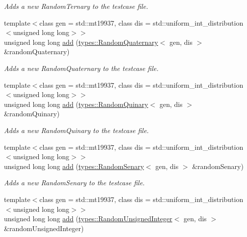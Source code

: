 \begin{DoxyCompactItemize}
\begin{DoxyCompactList}\small\item\em Adds a new Random\+Ternary to the testcase file. \end{DoxyCompactList}\item 
{\footnotesize template$<$class gen  = std\+::mt19937, class dis  = std\+::uniform\+\_\+int\+\_\+distribution$<$unsigned long long$>$$>$ }\\unsigned long long \mbox{\hyperlink{classtestcaser_1_1maker_1_1TestCaseBuilder_adcb4d6cfafbf67234818b0b68c586ad4}{add}} (\mbox{\hyperlink{structtestcaser_1_1maker_1_1types_1_1RandomQuaternary}{types\+::\+Random\+Quaternary}}$<$ gen, dis $>$ \&random\+Quaternary)
\begin{DoxyCompactList}\small\item\em Adds a new Random\+Quaternary to the testcase file. \end{DoxyCompactList}\item 
{\footnotesize template$<$class gen  = std\+::mt19937, class dis  = std\+::uniform\+\_\+int\+\_\+distribution$<$unsigned long long$>$$>$ }\\unsigned long long \mbox{\hyperlink{classtestcaser_1_1maker_1_1TestCaseBuilder_a8c036fe574ac265ebbe37225727047e6}{add}} (\mbox{\hyperlink{structtestcaser_1_1maker_1_1types_1_1RandomQuinary}{types\+::\+Random\+Quinary}}$<$ gen, dis $>$ \&random\+Quinary)
\begin{DoxyCompactList}\small\item\em Adds a new Random\+Quinary to the testcase file. \end{DoxyCompactList}\item 
{\footnotesize template$<$class gen  = std\+::mt19937, class dis  = std\+::uniform\+\_\+int\+\_\+distribution$<$unsigned long long$>$$>$ }\\unsigned long long \mbox{\hyperlink{classtestcaser_1_1maker_1_1TestCaseBuilder_a60ef1510e12a3cc6018c7b198a2165e5}{add}} (\mbox{\hyperlink{structtestcaser_1_1maker_1_1types_1_1RandomSenary}{types\+::\+Random\+Senary}}$<$ gen, dis $>$ \&random\+Senary)
\begin{DoxyCompactList}\small\item\em Adds a new Random\+Senary to the testcase file. \end{DoxyCompactList}\item 
{\footnotesize template$<$class gen  = std\+::mt19937, class dis  = std\+::uniform\+\_\+int\+\_\+distribution$<$unsigned long long$>$$>$ }\\unsigned long long \mbox{\hyperlink{classtestcaser_1_1maker_1_1TestCaseBuilder_a31403b4d313d7e3933252bcd89e4a060}{add}} (\mbox{\hyperlink{classtestcaser_1_1maker_1_1types_1_1RandomUnsignedInteger}{types\+::\+Random\+Unsigned\+Integer}}$<$ gen, dis $>$ \&random\+Unsigned\+Integer)

\end{DoxyCompactItemize}

